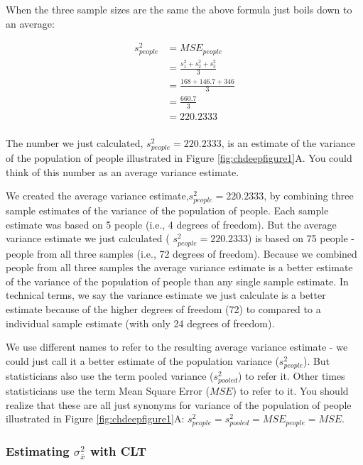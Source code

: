 \documentclass[
]{krantz}
\begin{document}
When the three sample sizes are the same the above formula just boils down to an average:

\[
\begin{aligned}
s_{people}^2 &= MSE_{people}\\
&= \frac{s_1^2 + s_2^2 + s_3^2}{3} \\
&= \frac{168 + 146.7 + 346 }{3} \\
&= \frac{660.7}{3} \\
&= 220.2333 \\
\end{aligned}
\]

The number we just calculated, \(s_{people}^2 =220.2333\), is an estimate of the variance of the population of people illustrated in Figure \ref{fig:chdeepfigure1}A. You could think of this number as an average variance estimate.

We created the average variance estimate,\(s_{people}^2 =220.2333\), by combining three sample estimates of the variance of the population of people. Each sample estimate was based on 5 people (i.e., 4 degrees of freedom). But the average variance estimate we just calculated ( \(s_{people}^2 =220.2333\)) is based on 75 people - people from all three samples (i.e., 72 degrees of freedom). Because we combined people from all three samples the average variance estimate is a better estimate of the variance of the population of people than any single sample estimate. In technical terms, we say the variance estimate we just calculate is a better estimate because of the higher degrees of freedom (72) to compared to a individual sample estimate (with only 24 degrees of freedom).

We use different names to refer to the resulting average variance estimate - we could just call it a better estimate of the population variance (\(s_{people}^2\)). But statisticians also use the term pooled variance (\(s_{pooled}^2\)) to refer it. Other times statisticians use the term Mean Square Error (\(MSE\)) to refer to it. You should realize that these are all just synonyms for variance of the population of people illustrated in Figure \ref{fig:chdeepfigure1}A: \(s_{people}^2 = s_{pooled}^2 = MSE_{people} = MSE\).

\hypertarget{estimating-sigma_barx2-with-clt}{%
\subsubsection{\texorpdfstring{Estimating \(\sigma_{\bar{x}}^2\) with CLT}{Estimating \textbackslash sigma\_\{\textbackslash bar\{x\}\}\^{}2 with CLT}}\label{estimating-sigma_barx2-with-clt}}
\end{document}
